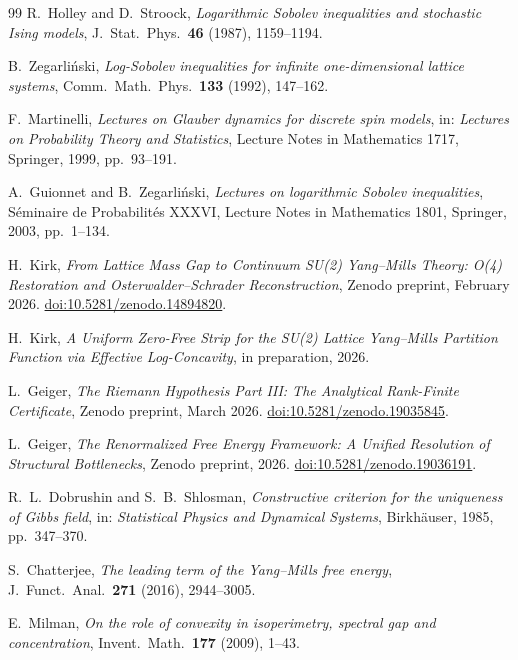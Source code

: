 \documentclass[12pt,a4paper]{article}
\theoremstyle{definition}
\theoremstyle{plain}
\theoremstyle{remark}
\begin{document}
\begin{thebibliography}{99}
R.~Holley and D.~Stroock, \emph{Logarithmic Sobolev inequalities and stochastic Ising models}, J.~Stat.\ Phys.\ \textbf{46} (1987), 1159--1194.

B.~Zegar\-li\'nski, \emph{Log-Sobolev inequalities for infinite one-dimensional lattice systems}, Comm.\ Math.\ Phys.\ \textbf{133} (1992), 147--162.

F.~Martinelli, \emph{Lectures on Glauber dynamics for discrete spin models}, in: \emph{Lectures on Probability Theory and Statistics}, Lecture Notes in Mathematics 1717, Springer, 1999, pp.~93--191.

A.~Guionnet and B.~Zegar\-li\'nski, \emph{Lectures on logarithmic Sobolev inequalities}, S\'eminaire de Probabilit\'es XXXVI, Lecture Notes in Mathematics 1801, Springer, 2003, pp.~1--134.

H.~Kirk, \emph{From Lattice Mass Gap to Continuum SU(2) Yang--Mills Theory: O(4) Restoration and Osterwalder--Schrader Reconstruction}, Zenodo preprint, February 2026.
\href{https://doi.org/10.5281/zenodo.14894820}{doi:10.5281/zenodo.14894820}.

H.~Kirk, \emph{A Uniform Zero-Free Strip for the SU(2) Lattice Yang--Mills Partition Function via Effective Log-Concavity}, in preparation, 2026.

L.~Geiger, \emph{The Riemann Hypothesis Part III: The Analytical Rank-Finite Certificate}, Zenodo preprint, March 2026.
\href{https://doi.org/10.5281/zenodo.19035845}{doi:10.5281/zenodo.19035845}.

L.~Geiger, \emph{The Renormalized Free Energy Framework: A Unified Resolution of Structural Bottlenecks}, Zenodo preprint, 2026.
\href{https://doi.org/10.5281/zenodo.19036191}{doi:10.5281/zenodo.19036191}.

R.~L.~Dobrushin and S.~B.~Shlosman, \emph{Constructive criterion for the
uniqueness of Gibbs field}, in: \emph{Statistical Physics and Dynamical
Systems}, Birkh\"auser, 1985, pp.~347--370.

S.~Chatterjee, \emph{The leading term of the Yang--Mills free energy},
J.~Funct.\ Anal.\ \textbf{271} (2016), 2944--3005.

E.~Milman, \emph{On the role of convexity in isoperimetry, spectral gap
and concentration}, Invent.\ Math.\ \textbf{177} (2009), 1--43.


\end{thebibliography}
\end{document}
